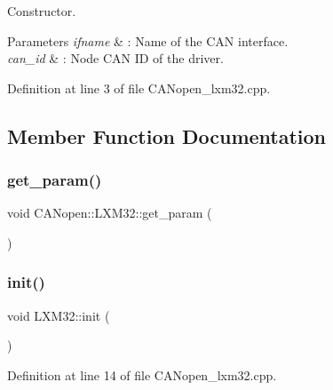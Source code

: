 Constructor. 


\begin{DoxyParams}{Parameters}
{\em ifname} & \+: Name of the C\+AN interface. \\
\hline
{\em can\+\_\+id} & \+: Node C\+AN ID of the driver. \\
\hline
\end{DoxyParams}


Definition at line 3 of file C\+A\+Nopen\+\_\+lxm32.\+cpp.



\subsection{Member Function Documentation}
\mbox{\label{class_c_a_nopen_1_1_l_x_m32_a22ac99e21e6c32626046d320c7bd3605}} 
\subsubsection{\texorpdfstring{get\+\_\+param()}{get\_param()}}
{\footnotesize\ttfamily void C\+A\+Nopen\+::\+L\+X\+M32\+::get\+\_\+param (\begin{DoxyParamCaption}{ }\end{DoxyParamCaption})}

\mbox{\label{class_c_a_nopen_1_1_l_x_m32_a3d325b9b19432dc05240ccfc328363d9}} 
\subsubsection{\texorpdfstring{init()}{init()}}
{\footnotesize\ttfamily void L\+X\+M32\+::init (\begin{DoxyParamCaption}{ }\end{DoxyParamCaption})}



Definition at line 14 of file C\+A\+Nopen\+\_\+lxm32.\+cpp.

\mbox{\label{class_c_a_nopen_1_1_l_x_m32_a545b23fab3528a8039bb2cc62808f9f5}} 
